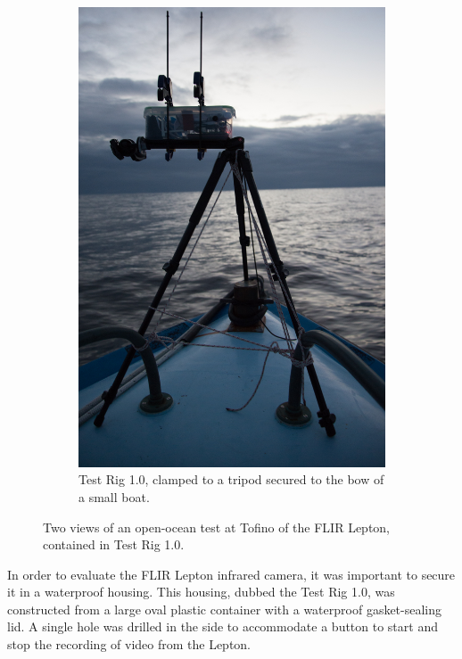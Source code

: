 \begin{figure}
\begin{subfigure}{.35\textwidth}
  \includegraphics[width=.95\linewidth]{"./image/20150219-_BEN2655"}
  \caption{Test Rig 1.0, clamped to a tripod secured to the bow of a small boat.}
  \label{fig:test_rig_1.0_tofino:sub2}
\end{subfigure}
\caption[Test Rig 1.0 open-ocean test.]{Two views of an open-ocean test at Tofino of the FLIR Lepton, contained in Test Rig 1.0.}
\label{fig:test_rig_1.0_tofino}
\end{figure}

In order to evaluate the FLIR Lepton infrared camera, it was important to secure it in a waterproof housing. This housing, dubbed the Test Rig 1.0, was constructed from a large oval plastic container with a waterproof gasket-sealing lid. A single hole was drilled in the side to accommodate a button to start and stop the recording of video from the Lepton.

